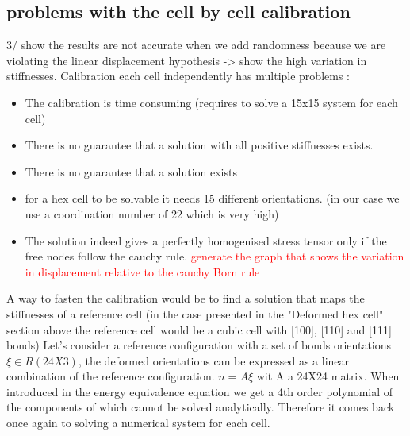 \documentclass[10pt, onecolumn]{article}
\begin{document}
    \subsection{problems with the cell by cell calibration}

    3/ show the results are not accurate when we add randomness because we are violating the linear displacement hypothesis -> show the high variation in stiffnesses. 
    Calibration each cell independently has multiple problems :
    \begin{itemize}
        \item The calibration is time consuming (requires to solve a 15x15 system for each cell)
        \item There is no guarantee that a solution with all positive stiffnesses exists.
        \item There is no guarantee that a solution exists
        \item for a hex cell to be solvable it needs 15 different orientations. (in our case we use a coordination number of 22 which is very high)
        \item The solution indeed gives a perfectly homogenised stress tensor only if the free nodes follow the cauchy rule. 
        \textcolor{red}{generate the graph that shows the variation in displacement relative to the cauchy Born rule}
    \end{itemize}

    A way to fasten the calibration would be to find a solution that maps the stiffnesses of a reference cell (in the case presented in the "Deformed hex cell" section above the reference cell would be a cubic cell with [100], [110] and [111] bonds)
    Let's consider a reference configuration with a set of bonds orientations $\xi \in R(24 X 3)$, the deformed orientations can be expressed as a linear combination of the reference configuration.
    $n = A \xi$ wit A a 24X24 matrix. When introduced in the energy equivalence equation we get a 4th order polynomial of the components of which cannot be solved analytically. Therefore it comes back once again to solving a numerical system for each cell.  
\end{document}
